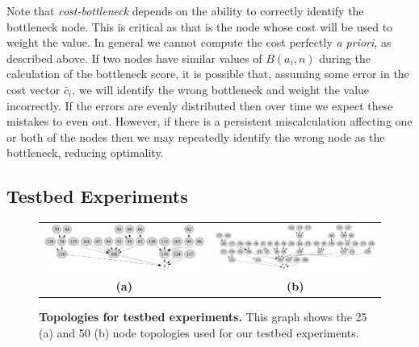 Note that \textit{cost-bottleneck} depends on the ability to correctly
identify the bottleneck node. This is critical as that is the node whose cost
will be used to weight the value. In general we cannot compute the cost
perfectly \textit{a priori}, as described above. If two nodes have similar
values of $B(a_i,n)$ during the calculation of the bottleneck score, it is
possible that, assuming some error in the cost vector $\bar{c}_i$, we will
identify the wrong bottleneck and weight the value incorrectly. If the errors
are evenly distributed then over time we expect these mistakes to even out.
However, if there is a persistent miscalculation affecting one or both of the
nodes then we may repeatedly identify the wrong node as the bottleneck,
reducing optimality.

\subsection{Testbed Experiments}
\label{lance-sec-eval-policies}

\begin{figure}[t]
\begin{center}
\begin{tabular}{cc}
\includegraphics[width=0.45\hsize]{./4-lance/figs/topology25.pdf} &
\includegraphics[width=0.45\hsize]{./4-lance/figs/topology50.pdf} \\
\textbf{(a)} &
\textbf{(b)} \\
\end{tabular}
\end{center}

\caption{\textbf{Topologies for testbed experiments.} This graph shows the 25
(a) and 50 (b) node topologies used for our testbed experiments.}

\label{lance-fig-topology}
\end{figure}

